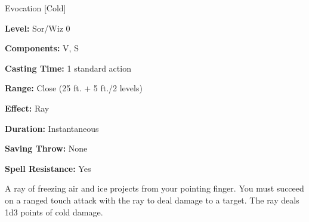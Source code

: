 
Evocation [Cold]

\textbf{Level:} Sor/Wiz 0

\textbf{Components:} V, S

\textbf{Casting Time:} 1 standard action

\textbf{Range:} Close (25 ft. + 5 ft./2 levels)

\textbf{Effect:} Ray

\textbf{Duration:} Instantaneous

\textbf{Saving Throw:} None

\textbf{Spell Resistance:} Yes

A ray of freezing air and ice projects from your pointing finger. You must succeed 
on a ranged touch attack with the ray to deal damage to a target. The ray deals 
1d3 points of cold damage.

